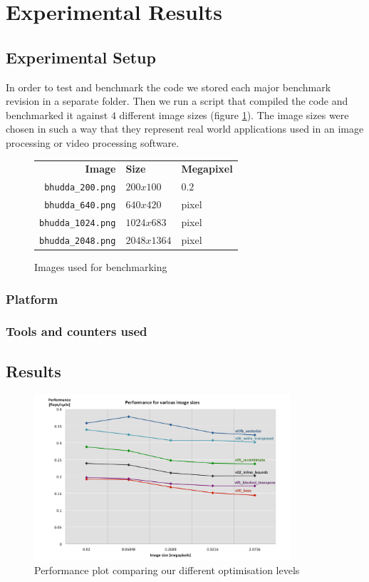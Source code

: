 \section{Experimental Results}\label{sec:exp}
\subsection{Experimental Setup}\label{sec:exp_setup8}
In order to test and benchmark the code we stored each major benchmark revision in a separate folder. Then we run a script that compiled the code and benchmarked it against $4$ different image sizes (figure \ref{tab:images}). The image sizes were chosen in such a way that they represent real world applications used in an image processing or video processing software.
\begin{figure}
\centering
\begin{tabular}{rll}
\textbf{Image} & \textbf{Size}  &\textbf{Megapixel}\\
\texttt{bhudda\_200.png} & $200x100$ & $0.2$\\
\texttt{bhudda\_640.png} & $640x420$ & pixel\\
\texttt{bhudda\_1024.png} & $1024x683$ & pixel\\
\texttt{bhudda\_2048.png} & $2048x1364$ & pixel\\
\end{tabular}
\caption{Images used for benchmarking}
\label{tab:images}
\end{figure}

\subsubsection{Platform}

\subsubsection{Tools and counters used}
\subsection{Results}
\begin{figure}
    \centering
    \includegraphics[width=0.85\textwidth]{figures/performance}
    \caption{Performance plot comparing our different optimisation levels}
    \label{fig:performance}
\end{figure}

